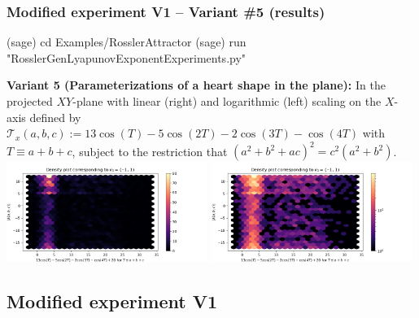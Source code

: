 \documentclass[usenames,svgnames,dvipsnames,10pt]{beamer}
\begin{document}
\begin{frame}[fragile]
\frametitle{Modified experiment V1 -- Variant \#5 (results)}

\begin{center}
\begin{code}
(sage) cd Examples/RosslerAttractor
(sage) run "RosslerGenLyapunovExponentExperiments.py"
\end{code}
\textbf{Variant 5 (Parameterizations of a heart shape in the plane):} 
In the projected $XY$-plane with linear (right) and logarithmic (left) scaling on the $X$-axis defined by 
$\mathcal{T}_x(a, b, c) :=13\cos(T)-5\cos(2T)-2\cos(3T)-\cos(4T)$ with $T \equiv a + b + c$, 
subject to the restriction that $(a^2+b^2+ac)^2 = c^2(a^2+b^2)$. \\ 
\includegraphics[width=0.49\textwidth]{../Images/RosslerAttractorExpt1-Variant265242-linearscale-TypeXY-2021-10-27-095559.png}
\includegraphics[width=0.49\textwidth]{../Images/RosslerAttractorExpt1-Variant265242-logscale-TypeXY-2021-10-27-095541.png}
\end{center}

\end{frame}

\subsection{Modified experiment V1}
\end{document}
